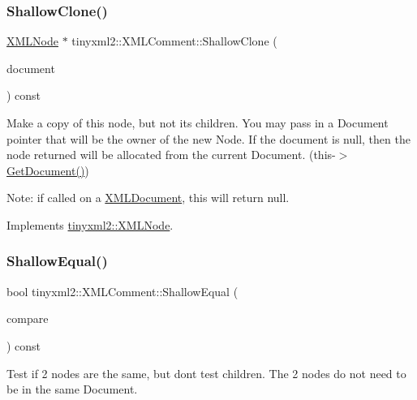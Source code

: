 \subsubsection{\texorpdfstring{Shallow\+Clone()}{ShallowClone()}}
{\footnotesize\ttfamily \hyperlink{classtinyxml2_1_1_x_m_l_node}{X\+M\+L\+Node} $\ast$ tinyxml2\+::\+X\+M\+L\+Comment\+::\+Shallow\+Clone (\begin{DoxyParamCaption}\item[{\hyperlink{classtinyxml2_1_1_x_m_l_document}{X\+M\+L\+Document} $\ast$}]{document }\end{DoxyParamCaption}) const\hspace{0.3cm}{\ttfamily [virtual]}}

Make a copy of this node, but not its children. You may pass in a Document pointer that will be the owner of the new Node. If the \textquotesingle{}document\textquotesingle{} is null, then the node returned will be allocated from the current Document. (this-\/$>$\hyperlink{classtinyxml2_1_1_x_m_l_node_af343d1ef0b45c0020e62d784d7e67a68}{Get\+Document()})

Note\+: if called on a \hyperlink{classtinyxml2_1_1_x_m_l_document}{X\+M\+L\+Document}, this will return null. 

Implements \hyperlink{classtinyxml2_1_1_x_m_l_node_a8402cbd3129d20e9e6024bbcc0531283}{tinyxml2\+::\+X\+M\+L\+Node}.

\mbox{\label{classtinyxml2_1_1_x_m_l_comment_a965d880a99d58dd915caa88dc37a9b51}} 
\subsubsection{\texorpdfstring{Shallow\+Equal()}{ShallowEqual()}}
{\footnotesize\ttfamily bool tinyxml2\+::\+X\+M\+L\+Comment\+::\+Shallow\+Equal (\begin{DoxyParamCaption}\item[{const \hyperlink{classtinyxml2_1_1_x_m_l_node}{X\+M\+L\+Node} $\ast$}]{compare }\end{DoxyParamCaption}) const\hspace{0.3cm}{\ttfamily [virtual]}}

Test if 2 nodes are the same, but don\textquotesingle{}t test children. The 2 nodes do not need to be in the same Document.

